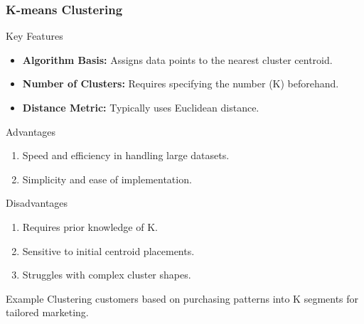 \documentclass[aspectratio=169]{beamer}
\begin{document}
\begin{frame}[fragile]
    \frametitle{K-means Clustering}

    \begin{block}{Key Features}
        \begin{itemize}
            \item \textbf{Algorithm Basis:} Assigns data points to the nearest cluster centroid.
            \item \textbf{Number of Clusters:} Requires specifying the number (K) beforehand.
            \item \textbf{Distance Metric:} Typically uses Euclidean distance.
        \end{itemize}
    \end{block}
    
    \begin{block}{Advantages}
        \begin{enumerate}
            \item Speed and efficiency in handling large datasets.
            \item Simplicity and ease of implementation.
        \end{enumerate}
    \end{block}
    
    \begin{block}{Disadvantages}
        \begin{enumerate}
            \item Requires prior knowledge of K.
            \item Sensitive to initial centroid placements.
            \item Struggles with complex cluster shapes.
        \end{enumerate}
    \end{block}

    \begin{exampleblock}{Example}
        Clustering customers based on purchasing patterns into K segments for tailored marketing.
    \end{exampleblock}
\end{frame}
\end{document}
